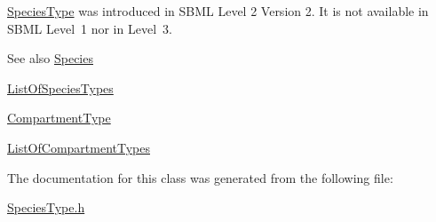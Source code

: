 \hyperlink{class_species_type}{Species\+Type} was introduced in S\+B\+ML Level 2 Version 2. It is not available in S\+B\+ML Level~1 nor in Level~3.

\begin{DoxySeeAlso}{See also}
\hyperlink{class_species}{Species} 

\hyperlink{class_list_of_species_types}{List\+Of\+Species\+Types} 

\hyperlink{class_compartment_type}{Compartment\+Type} 

\hyperlink{class_list_of_compartment_types}{List\+Of\+Compartment\+Types} 
\end{DoxySeeAlso}


The documentation for this class was generated from the following file\+:\begin{DoxyCompactItemize}
\item 
\hyperlink{_species_type_8h}{Species\+Type.\+h}\end{DoxyCompactItemize}
